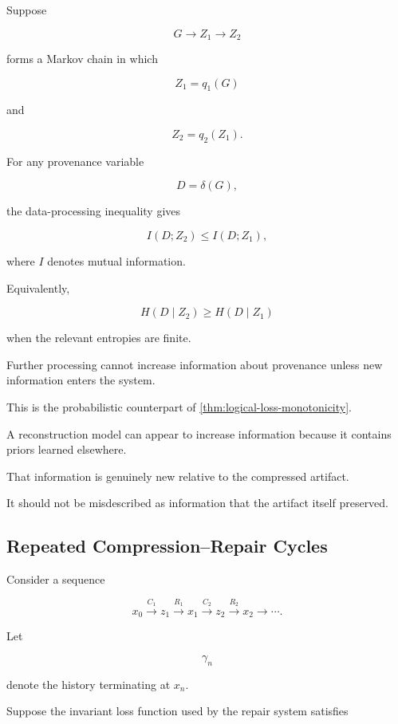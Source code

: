 \documentclass[
  11pt,
  a4paper,
  DIV=12,
  BCOR=0mm,
  parskip=half-
]{scrartcl}
\theoremstyle{definition}
\theoremstyle{plain}
\theoremstyle{remark}
\begin{document}
Suppose

\[
  G\to Z_1\to Z_2
\]

forms a Markov chain in which

\[
  Z_1=q_1(G)
\]

and

\[
  Z_2=q_2(Z_1).
\]

For any provenance variable

\[
  D=\delta(G),
\]

the data-processing inequality gives

\[
  I(D;Z_2)
  \leq
  I(D;Z_1),
\]

where \(I\) denotes mutual information.

Equivalently,

\[
  H(D\mid Z_2)
  \geq
  H(D\mid Z_1)
\]

when the relevant entropies are finite.

Further processing cannot increase information about provenance unless new
information enters the system.

This is the probabilistic counterpart of
\cref{thm:logical-loss-monotonicity}.

A reconstruction model can appear to increase information because it contains
priors learned elsewhere.

That information is genuinely new relative to the compressed artifact.

It should not be misdescribed as information that the artifact itself
preserved.


\subsection{Repeated Compression--Repair Cycles}
\label{app:compression-repair-cycles}

Consider a sequence

\[
  x_0
  \xrightarrow{C_1}
  z_1
  \xrightarrow{R_1}
  x_1
  \xrightarrow{C_2}
  z_2
  \xrightarrow{R_2}
  x_2
  \to\cdots.
\]

Let

\[
  \gamma_n
\]

denote the history terminating at \(x_n\).

Suppose the invariant loss function used by the repair system satisfies
\end{document}
